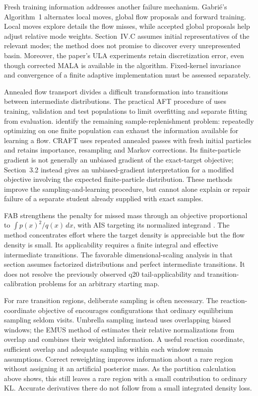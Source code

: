 Fresh training information addresses another failure mechanism. Gabri\'e's
Algorithm~1 alternates local moves, global flow proposals and forward
training. Local moves explore details the flow misses, while accepted
global proposals help adjust relative mode weights. Section~IV.C assumes
initial representatives of the relevant modes; the method does not promise
to discover every unrepresented basin. Moreover, the paper's ULA experiments
retain discretization error, even though corrected MALA is available in the
algorithm. Fixed-kernel invariance and convergence of a finite adaptive
implementation must be assessed separately.

Annealed flow transport divides a difficult transformation into transitions
between intermediate distributions. The practical AFT procedure of
\citet[][Sec.~3.3 and Appendix~F]{arbel2021aft} uses training, validation
and test populations to limit overfitting and separate fitting from
evaluation. \citet[][Sec.~2.3]{matthews2022craft} identify the remaining
sample-replenishment problem: repeatedly optimizing on one finite
population can exhaust the information available for learning a flow.
CRAFT uses repeated annealed passes with fresh initial particles and retains
importance, resampling and Markov corrections. Its finite-particle gradient
is not generally an unbiased gradient of the exact-target objective;
Section~3.2 instead gives an unbiased-gradient interpretation for a modified
objective involving the expected finite-particle distribution. These methods
improve the sampling-and-learning procedure, but cannot alone explain or
repair failure of a separate student already supplied with exact samples.

FAB strengthens the penalty for missed mass through an objective
proportional to $\int p(x)^2/q(x)\,dx$, with AIS targeting its normalized
integrand \citep[][Sec.~3.1]{midgley2023fab}. The method concentrates effort
where the target density is appreciable but the flow density is small.
Its applicability requires a finite integral and effective intermediate
transitions. The favorable dimensional-scaling analysis in that section
assumes factorized distributions and perfect intermediate transitions.
It does not resolve the previously observed q20 tail-applicability and
transition-calibration problems for an arbitrary starting map.

For rare transition regions, deliberate sampling is often necessary.
The reaction-coordinate objective of \citet{noe2019boltzmanngenerators}
encourages configurations that ordinary equilibrium sampling seldom visits.
Umbrella sampling instead uses overlapping biased windows; the EMUS method
of \citet[][Secs.~II--III, Eqs.~(9)--(17)]{thiede2016emus} estimates their
relative normalizations from overlap and combines their weighted information.
A useful reaction coordinate, sufficient overlap and adequate sampling within
each window remain assumptions. Correct reweighting improves information
about a rare region without assigning it an artificial posterior mass.
As the partition calculation above shows, this still leaves a rare region
with a small contribution to ordinary KL. Accurate derivatives there do not
follow from a small integrated density loss.

